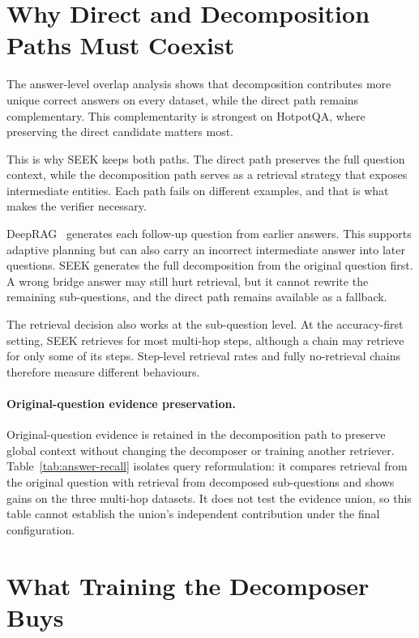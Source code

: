 \documentclass{nthu_thesis}
\begin{document}
\begin{thesiscjk}
\section{Why Direct and Decomposition Paths Must Coexist}
\label{sec:path-complementarity}

The answer-level overlap analysis shows that decomposition contributes more unique correct answers on every dataset, while the direct path remains complementary. This complementarity is strongest on HotpotQA, where preserving the direct candidate matters most.

This is why SEEK keeps both paths. The direct path preserves the full question context, while the decomposition path serves as a retrieval strategy that exposes intermediate entities. Each path fails on different examples, and that is what makes the verifier necessary.

DeepRAG~\cite{deeprag} generates each follow-up question from earlier answers. This supports adaptive planning but can also carry an incorrect intermediate answer into later questions. SEEK generates the full decomposition from the original question first. A wrong bridge answer may still hurt retrieval, but it cannot rewrite the remaining sub-questions, and the direct path remains available as a fallback.

The retrieval decision also works at the sub-question level. At the accuracy-first setting, SEEK retrieves for most multi-hop steps, although a chain may retrieve for only some of its steps. Step-level retrieval rates and fully no-retrieval chains therefore measure different behaviours.

\paragraph{Original-question evidence preservation.} Original-question evidence is retained in the decomposition path to preserve global context without changing the decomposer or training another retriever. Table~\ref{tab:answer-recall} isolates query reformulation: it compares retrieval from the original question with retrieval from decomposed sub-questions and shows gains on the three multi-hop datasets. It does not test the evidence union, so this table cannot establish the union's independent contribution under the final configuration.

\section{What Training the Decomposer Buys}
\label{sec:decomposer-training-discussion}


\end{thesiscjk}
\end{document}
